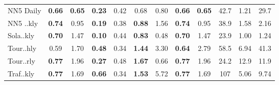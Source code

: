 \begin{tabular}{l|ccc|ccc||ccc||cc}
        NN5 Daily & \textbf{0.66} & \textbf{0.65} & \textbf{0.23} & 0.42 & 0.68 & 0.80 & \textbf{0.66} & \textbf{0.65} & 42.7 & 1.21 & 29.7 \\
        NN5 ..kly & \textbf{0.74} & 0.95 & \textbf{0.19} & 0.38 & \textbf{0.88} & 1.56 & \textbf{0.74} & 0.95 & 38.9 & 1.58 & 2.16 \\
        Sola..kly & \textbf{0.70} & 1.47 & \textbf{0.10} & 0.44 & \textbf{0.83} & 0.48 & \textbf{0.70} & 1.47 & 23.9 & 1.00 & 1.24 \\
        Tour..hly & 0.59 & 1.70 & \textbf{0.48} & 0.34 & \textbf{1.44} & 3.30 & \textbf{0.64} & 2.79 & 58.5 & 6.94 & 41.3 \\
        Tour..rly & \textbf{0.77} & 1.96 & \textbf{0.27} & 0.48 & \textbf{1.67} & 0.66 & \textbf{0.77} & 1.96 & 24.2 & 12.9 & 11.9 \\
        Traf..kly & \textbf{0.77} & 1.69 & \textbf{0.66} & 0.34 & \textbf{1.53} & 5.72 & \textbf{0.77} & 1.69 & 107 & 5.06 & 9.74 \\
        \bottomrule
    \end{tabular}